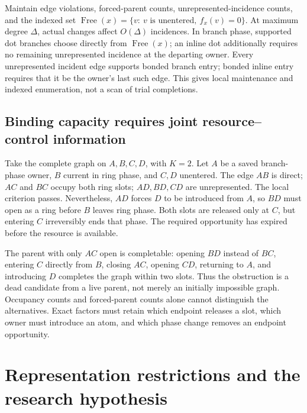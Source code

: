\documentclass[11pt,a4paper]{article}
\begin{document}
Maintain edge violations, forced-parent counts, unrepresented-incidence counts,
and the indexed set
\(\operatorname{Free}(x)=\{v:\ v\text{ is unentered},\ f_x(v)=0\}\).
At maximum degree \(\Delta\), actual changes affect \(O(\Delta)\) incidences.
In branch phase, supported dot branches choose directly from
\(\operatorname{Free}(x)\); an inline dot additionally requires no remaining
unrepresented incidence at the departing owner. Every unrepresented incident
edge supports bonded branch entry; bonded inline entry requires that it be the
owner's last such edge. This gives local maintenance and indexed enumeration,
not a scan of trial completions.\cite{attempt}

\subsection{Binding capacity requires joint resource--control information}
Take the complete graph on \(A,B,C,D\), with \(K=2\). Let \(A\) be a saved
branch-phase owner, \(B\) current in ring phase, and \(C,D\) unentered. The edge
\(AB\) is direct; \(AC\) and \(BC\) occupy both ring slots; \(AD,BD,CD\) are
unrepresented. The local criterion passes. Nevertheless, \(AD\) forces \(D\)
to be introduced from \(A\), so \(BD\) must open as a ring before \(B\) leaves
ring phase. Both slots are released only at \(C\), but entering \(C\) irreversibly
ends that phase. The required opportunity has expired before the resource is
available.

The parent with only \(AC\) open is completable: opening \(BD\) instead of
\(BC\), entering \(C\) directly from \(B\), closing \(AC\), opening \(CD\),
returning to \(A\), and introducing \(D\) completes the graph within two slots.
Thus the obstruction is a dead candidate from a live parent, not merely an
initially impossible graph. Occupancy counts and forced-parent counts alone
cannot distinguish the alternatives. Exact factors must retain which endpoint
releases a slot, which owner must introduce an atom, and which phase change
removes an endpoint opportunity.\cite{attempt}

\section{Representation restrictions and the research hypothesis}
\end{document}
